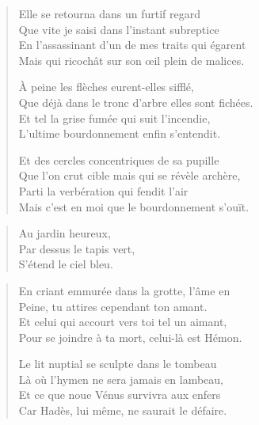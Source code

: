 \begin{verse}\quatrain
  Elle se retourna dans un furtif regard\\  %
  Que vite je saisi dans l’instant subreptice\\   %
  En l’assassinant d’un de mes traits qui égarent\\   %
  Mais qui ricochât sur son œil plein de malices. 

  À peine les flèches eurent-elles sifflé,\\   %
  Que déjà dans le tronc d’arbre elles sont fichées.\\   %
  Et tel la grise fumée  qui suit  l’incendie,\\   %
  L’ultime bourdonnement enfin s’entendit. 

  Et des cercles concentriques de sa pupille\\   %
  Que l’on crut cible mais qui se révèle archère,\\   %
  Parti la verbération qui fendit l’air\\   %
  Mais c’est en moi que le bourdonnement s’ouït. 
\end{verse}



\begin{verse}\haiku
  Au jardin heureux,\\  %
  Par dessus le tapis  vert,\\  %
  S’étend le ciel bleu.
\end{verse}

\begin{verse}\quatrain
  En criant emmurée dans la grotte, l’âme en\\  %
  Peine, tu attires cependant ton amant.\\  %
  Et celui qui accourt vers toi tel un aimant,\\  %
  Pour se joindre à ta mort, celui-là est Hémon.

  Le lit nuptial se sculpte dans le tombeau\\  %
  Là où l’hymen ne sera jamais en lambeau,\\  %
  Et ce que noue Vénus survivra aux enfers\\  %
  Car Hadès, lui même, ne saurait le défaire. 
\end{verse}

